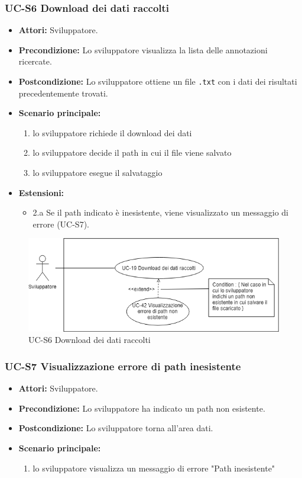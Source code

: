 	\subsubsection{UC-S6 Download dei dati raccolti}
		\begin{itemize}
			\item \textbf{Attori:} Sviluppatore.
			\item \textbf{Precondizione:} Lo sviluppatore visualizza la lista delle annotazioni ricercate.
			\item \textbf{Postcondizione:} Lo sviluppatore ottiene un file \texttt{.txt} con i dati dei risultati precedentemente trovati.
			\item \textbf{Scenario principale:}
				\begin{enumerate}
					\item lo sviluppatore richiede il download dei dati
					\item lo sviluppatore decide il path in cui il file viene salvato
					\item lo sviluppatore esegue il salvataggio
				\end{enumerate}
			\item \textbf{Estensioni:}
				\begin{itemize}
					\item 2.a Se il path indicato è inesistente, viene visualizzato un messaggio di errore (UC-S7).
				\end{itemize}
		\end{itemize}
		\begin{figure}[h]
			\centering
			\includegraphics[scale=0.7]{images/UC-19.png}
			\caption{UC-S6 Download dei dati raccolti}
		\end{figure}	

	\subsubsection{UC-S7 Visualizzazione errore di path inesistente}
		\begin{itemize}					
			\item \textbf{Attori:} Sviluppatore.
			\item \textbf{Precondizione:} Lo sviluppatore ha indicato un path non esistente.
			\item \textbf{Postcondizione:} Lo sviluppatore torna all'area dati.
			\item \textbf{Scenario principale:}
				\begin{enumerate}
					\item lo sviluppatore visualizza un messaggio di errore "Path inesistente"
				\end{enumerate}	
		\end{itemize}				
				
